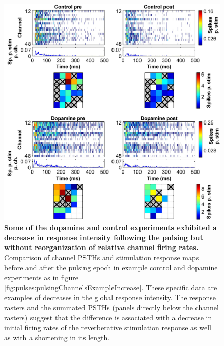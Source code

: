   \begin{figure}[!htb]
       \centering
       \includegraphics[width=15cm]{chapter6/figures/pulsingChannelsExample/pulsesChannelExampleDecrease.jpg}

       \caption[Channel PSTHs before and after administration of pulsing protocol with dopamine or control solutions - example of global decrease in response intensity]{\textbf{Some of the dopamine and control experiments exhibited a decrease in response intensity following the pulsing but without reorganization of relative channel firing rates.} Comparison of channel PSTHs and stimulation response maps before and after the pulsing epoch in example control and dopamine experiments as in figure \ref{fig:pulses:pulsingChannelsExampleIncrease}. These specific data are examples of decreases in the global response intensity. The response rasters and the summated PSTHs (panels directly below the channel rasters) suggest that the difference is associated with a decrease in initial firing rates of the reverberative stimulation response as well as with a shortening in its length.}

       \label{fig:pulses:pulsingChannelsExampleDecrease}
  \end{figure}



